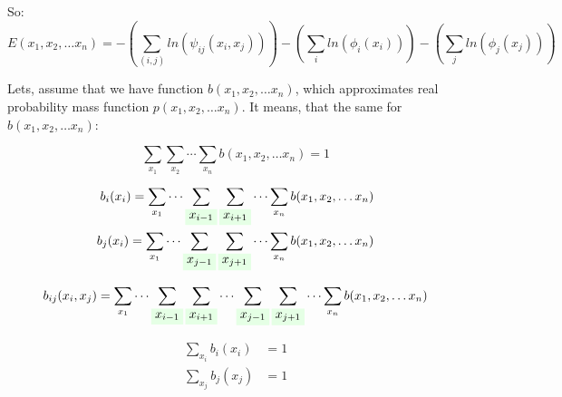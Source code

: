 \documentclass[fleqn,leqno]{article}
\newcommand{\highlight}[1]{\colorbox{green!10}{$\displaystyle#1$}}
\begin{document}
So:
\begin{equation} \label{eq:energy_expression}
E(x_1, x_2, \dots x_n) = - \left( \sum_{(i, j)} ln(\psi_{ij}(x_i, x_j)) \right) - \left( \sum_{i} ln(\phi_i(x_i)) \right) - \left( \sum_{j} ln(\phi_j(x_j)) \right)
\end{equation}

Lets, assume that we have function $b(x_1, x_2, \dots x_n)$, which approximates real probability mass function $p(x_1, x_2, \dots x_n)$.
It means, that  the same for $b(x_1, x_2, \dots x_n)$:

\begin{equation} \label{eq:probability_sum_b}
\sum_{x_1} \sum_{x_2} \cdots \sum_{x_n}  b(x_1, x_2, \dots x_n) = 1
\end{equation}

\begin{equation} \label{eq:marginal_probabilities_one_node_b}
\begin{split}
b_i(x_i) = \sum_{x_1} \cdots \sum_{ \highlight{ x_{i - 1} } } \sum_{ \highlight{ x_{i + 1} } } \cdots \sum_{x_n} b(x_1, x_2, \dots x_n) \\
b_j(x_i) = \sum_{x_1} \cdots \sum_{ \highlight{ x_{j - 1} } } \sum_{ \highlight{ x_{j + 1} } } \cdots \sum_{x_n} b(x_1, x_2, \dots x_n) \\
\end{split}
\end{equation}

\begin{equation} \label{eq:marginal_probabilities_two_nodes_b}
\begin{split}
b_{ij}(x_i, x_j) = \sum_{x_1} \cdots \sum_{ \highlight{ x_{i - 1} } } \sum_{ \highlight{ x_{i + 1} } } \cdots \sum_{ \highlight{ x_{j - 1} } } \sum_{ \highlight{ x_{j + 1} } } \cdots \sum_{x_n} b(x_1, x_2, \dots x_n)
\end{split}
\end{equation}

\begin{equation} \label{eq:sum_over_states_of_one_node_marginal_probabilities_b}
\begin{split}
\sum_{x_i} b_i(x_i) & = 1 \\
\sum_{x_j} b_j(x_j) & = 1
\end{split}
\end{equation}
\end{document}
